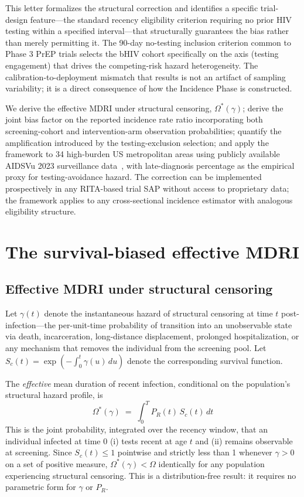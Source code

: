 \documentclass[11pt]{article}
\begin{document}
This letter formalizes the structural correction and identifies a specific trial-design feature---the standard recency eligibility criterion requiring no prior HIV testing within a specified interval---that structurally guarantees the bias rather than merely permitting it. The 90-day no-testing inclusion criterion common to Phase 3 PrEP trials selects the bHIV cohort specifically on the axis (testing engagement) that drives the competing-risk hazard heterogeneity. The calibration-to-deployment mismatch that results is not an artifact of sampling variability; it is a direct consequence of how the Incidence Phase is constructed.

We derive the effective MDRI under structural censoring, $\Omega^*(\gamma)$; derive the joint bias factor on the reported incidence rate ratio incorporating both screening-cohort and intervention-arm observation probabilities; quantify the amplification introduced by the testing-exclusion selection; and apply the framework to 34 high-burden US metropolitan areas using publicly available AIDSVu 2023 surveillance data~\cite{aidsvu2023}, with late-diagnosis percentage as the empirical proxy for testing-avoidance hazard. The correction can be implemented prospectively in any RITA-based trial SAP without access to proprietary data; the framework applies to any cross-sectional incidence estimator with analogous eligibility structure.

\section{The survival-biased effective MDRI}

\subsection{Effective MDRI under structural censoring}

Let $\gamma(t)$ denote the instantaneous hazard of structural censoring at time $t$ post-infection---the per-unit-time probability of transition into an unobservable state via death, incarceration, long-distance displacement, prolonged hospitalization, or any mechanism that removes the individual from the screening pool. Let $S_c(t) = \exp\!\left(-\int_0^t \gamma(u)\,du\right)$ denote the corresponding survival function.

The \emph{effective} mean duration of recent infection, conditional on the population's structural hazard profile, is
\begin{equation}
\Omega^*(\gamma) \;=\; \int_0^T P_R(t)\,S_c(t)\,dt \label{eq:omega_star}
\end{equation}
This is the joint probability, integrated over the recency window, that an individual infected at time 0 (i) tests recent at age $t$ and (ii) remains observable at screening. Since $S_c(t) \leq 1$ pointwise and strictly less than 1 whenever $\gamma > 0$ on a set of positive measure, $\Omega^*(\gamma) < \Omega$ identically for any population experiencing structural censoring. This is a distribution-free result: it requires no parametric form for $\gamma$ or $P_R$.
\end{document}
